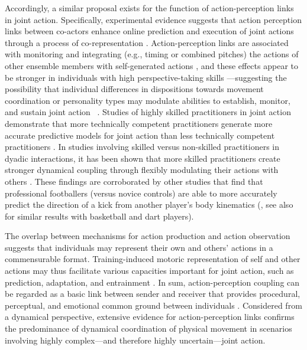 \begin{CJK}{UTF8}{gbsn}
Accordingly, a similar proposal exists for the function of action-perception links in joint action. Specifically, experimental evidence suggests that action perception links between co-actors enhance online prediction and execution of joint actions through a process of co-representation \citep{Novembre2014}.  Action-perception links are associated with monitoring and integrating (e.g., timing or combined pitches) the actions of other ensemble members with self-generated actions \citep{Loehr2013}, and these effects appear to be stronger in individuals with high perspective-taking skills \citep{Novembre2012,Loehr2013}---suggesting the possibility that individual differences in dispositions towards movement coordination or personality types may modulate abilities to establish, monitor, and sustain joint action ~\citep{Marsh2009,Keller2012}.
Studies of highly skilled practitioners in joint action demonstrate that more technically competent practitioners generate more accurate predictive models for joint action than less technically competent practitioners \citep{Tomeo2012,Aglioti2008,Mulligan2016}.  In studies involving skilled versus non-skilled practitioners in dyadic interactions, it has been shown that more skilled practitioners create stronger dynamical coupling through flexibly modulating their actions with others \citep{Schmidt2011,Caron2017}.  These findings are corroborated by other studies that find that professional footballers (versus novice controls) are able to more accurately predict the direction of a kick from another player's body kinematics (\cite{Tomeo2012}, see also \cite{Aglioti2008,Mulligan2016} for similar results with basketball and dart players).

The overlap between mechanisms for action production and action observation suggests that individuals may represent their own and others' actions in a commensurable format. Training-induced motoric representation of self and other actions may thus facilitate various capacities important for joint action, such as prediction, adaptation, and entrainment \citep{Novembre2014}.  In sum, action-perception coupling can be regarded as a basic link between sender and receiver that provides procedural, perceptual, and emotional common ground between individuals \citep{Rizzolatti1998}. Considered from a dynamical perspective, extensive evidence for action-perception links confirms the predominance of dynamical coordination of physical movement in scenarios involving highly complex---and therefore highly uncertain---joint action.


\end{CJK}
